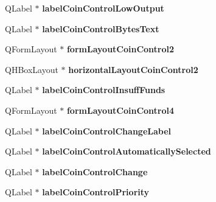 \begin{DoxyCompactItemize}
\item 
\mbox{\label{class_ui___privacy_dialog_acacfd2e64479a0fdb94e8ca7894b6cc3}} 
Q\+Label $\ast$ {\bfseries label\+Coin\+Control\+Low\+Output}
\item 
\mbox{\label{class_ui___privacy_dialog_ad0b94538a17e1e119b5cdb53cecccee3}} 
Q\+Label $\ast$ {\bfseries label\+Coin\+Control\+Bytes\+Text}
\item 
\mbox{\label{class_ui___privacy_dialog_a25941f6fc3fbdf198a9dec7ecfafa864}} 
Q\+Form\+Layout $\ast$ {\bfseries form\+Layout\+Coin\+Control2}
\item 
\mbox{\label{class_ui___privacy_dialog_ae28203be4f0f7a7a8ebb6eb54c4cb7af}} 
Q\+H\+Box\+Layout $\ast$ {\bfseries horizontal\+Layout\+Coin\+Control2}
\item 
\mbox{\label{class_ui___privacy_dialog_a0037bf99c9c0653b0db45ac6b8a0dea3}} 
Q\+Label $\ast$ {\bfseries label\+Coin\+Control\+Insuff\+Funds}
\item 
\mbox{\label{class_ui___privacy_dialog_a80dfa613c5fc3d056e9b59e597fb3235}} 
Q\+Form\+Layout $\ast$ {\bfseries form\+Layout\+Coin\+Control4}
\item 
\mbox{\label{class_ui___privacy_dialog_a86385560ba8a1fc06876543f44a7c26d}} 
Q\+Label $\ast$ {\bfseries label\+Coin\+Control\+Change\+Label}
\item 
\mbox{\label{class_ui___privacy_dialog_a573ebb9da7d09895bf0a93e7e858c70d}} 
Q\+Label $\ast$ {\bfseries label\+Coin\+Control\+Automatically\+Selected}
\item 
\mbox{\label{class_ui___privacy_dialog_aff33ba7ea4a6ff4be451a40dab34a0a6}} 
Q\+Label $\ast$ {\bfseries label\+Coin\+Control\+Change}
\item 
\mbox{\label{class_ui___privacy_dialog_aabad605027c250f895b7b0721fba56a2}} 
Q\+Label $\ast$ {\bfseries label\+Coin\+Control\+Priority}

\end{DoxyCompactItemize}

